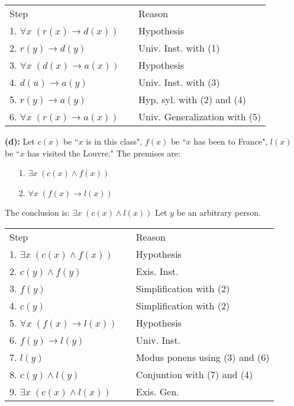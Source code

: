 \documentclass[12pt]{exam}
\begin{document}
\begin{questions}
\begin{solution}
    \smallskip
    \begin{tabular}{lll}
        Step        & \hspace{0.2in} & Reason \\
        1. $\forall x\;(r(x) \rightarrow d(x))$     &   & Hypothesis \\
        2. $r(y) \rightarrow d(y)$                  & & Univ. Inst. with (1) \\
        3. $\forall x\; (d(x) \rightarrow a(x))$    &   & Hypothesis \\
        4. $d(u) \rightarrow a(y)$                  &   & Univ. Inst. with (3) \\
        5. $r(y) \rightarrow a(y)$                  &   & Hyp. syl. with (2) and (4) \\
        6. $\forall x\;(r(x) \rightarrow a(x))$     &   & Univ. Generalization with (5) \\
    \end{tabular}

    \medskip
    \textbf{(d):} Let $c(x)$ be ``$x$ is in this class", $f(x)$ be ``$x$ has been to France", $l(x)$ be ``$x$ has visited the Louvre." The premises are:
    \begin{itemize}
        \item[1.] $\exists x\;(c(x) \wedge f(x))$
        \item[2.] $\forall x\;(f(x) \rightarrow l(x))$
    \end{itemize}
    The conclusion is: $\exists x\; (c(x) \wedge l(x))$
    Let $y$ be an arbitrary person.

    \smallskip
    \begin{tabular}{lll}
        Step        & \hspace{0.2in} & Reason \\
        1. $\exists x\;(c(x) \wedge f(x))$      & & Hypothesis \\
        2. $c(y) \wedge f(y)$                   & & Exis. Inst. \\
        3. $f(y)$                               & & Simplification with (2) \\
        4. $c(y)$                               & & Simplification with (2) \\
        5. $\forall x\;(f(x) \rightarrow l(x))$ & & Hypothesis \\
        6. $f(y) \rightarrow l(y)$              & & Univ. Inst. \\
        7. $l(y)$                               & & Modus ponens using (3) and (6) \\
        8. $c(y) \wedge l(y)$                   & & Conjuntion with (7) and (4) \\
        9. $\exists x\; (c(x) \wedge l(x))$     & & Exis. Gen. \\
    \end{tabular}
    \end{solution}



\end{questions}
\end{document}

